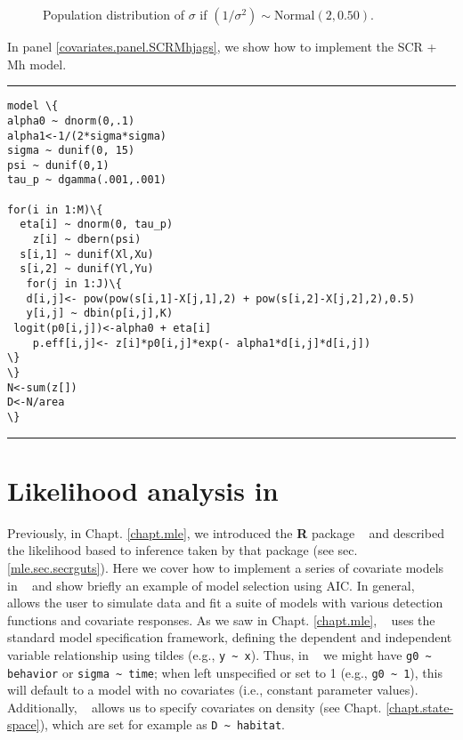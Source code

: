 \begin{figure}[ht]
\caption{
Population distribution of $\sigma$ if $(1/\sigma^{2}) \sim \mbox{Normal}(2, 0.50)$.
}
\label{covariates.fig.one}
\end{figure}


In panel \ref{covariates.panel.SCRMhjags}, we show how to implement the SCR + Mh model.  

\begin{panel}[htp]
\centering
\rule[0.1in]{\textwidth}{.03in}
{\small
\begin{Verbatim}[commandchars=\\\{\}]
model \{
alpha0 ~ dnorm(0,.1)
alpha1<-1/(2*sigma*sigma)
sigma ~ dunif(0, 15)
psi ~ dunif(0,1)
tau_p ~ dgamma(.001,.001)

for(i in 1:M)\{
  eta[i] ~ dnorm(0, tau_p)
    z[i] ~ dbern(psi)
  s[i,1] ~ dunif(Xl,Xu)
  s[i,2] ~ dunif(Yl,Yu)
   for(j in 1:J)\{
   d[i,j]<- pow(pow(s[i,1]-X[j,1],2) + pow(s[i,2]-X[j,2],2),0.5)
   y[i,j] ~ dbin(p[i,j],K)
 logit(p0[i,j])<-alpha0 + eta[i]
    p.eff[i,j]<- z[i]*p0[i,j]*exp(- alpha1*d[i,j]*d[i,j])
\}
\}
N<-sum(z[])
D<-N/area
\}

\end{Verbatim}
}

\rule[-0.1in]{\textwidth}{.03in}
\caption{
\jags~ model specification for the SCR + Mh model with half-normal distance
function.}
\label{covariates.panel.SCRMhjags}
\end{panel}







\section{Likelihood analysis in \secr}
\label{likelihood.secr}

Previously, in Chapt. \ref{chapt.mle}, we introduced the {\bf R}
package \secr~ and described the likelihood based to inference taken
by that package (see sec. \ref{mle.sec.secrguts}).  Here we cover how
to implement a series of covariate models in \secr~ and show briefly
an example of model selection using AIC.  In general, \secr~ allows
the user to simulate data and fit a suite of models with various
detection functions and covariate responses.  As we saw in
Chapt. \ref{chapt.mle}, \secr~ uses the standard \R model
specification framework, defining the dependent and independent
variable relationship using tildes (e.g., \Verb+y ~ x+).  Thus, in
\secr~ we might have \verb+g0 ~ behavior+ or
\verb+sigma ~ time+; when left unspecified or set to 1 (e.g.,
\verb+g0 ~ 1+), this will default to a model with no covariates (i.e.,
constant parameter values).  Additionally, \secr~ allows us to specify
covariates on density (see Chapt. \ref{chapt.state-space}), which are set for
example as \verb+D ~ habitat+.

